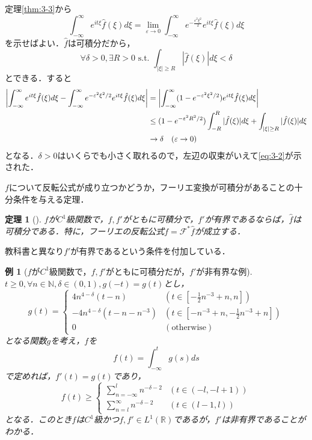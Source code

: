 \documentclass[dvipdfmx,a4j,10pt]{jsarticle}
\makeatletter
\theoremstyle{mystyle1}
\newtheorem{theorem}{定理}[section]
\theoremstyle{mystyle3}
\theoremstyle{mystyle4}
\theoremstyle{mystyle6}
\theoremstyle{mystyle2}
\newtheorem{ex*}{例}
\theoremstyle{mystyle5}
\renewenvironment{proof}[1][\proofname]{\par
  \pushQED{\qed}%
  \normalfont
  \topsep6\p@\@plus6\p@ \trivlist
  \item[\hskip\labelsep{\bfseries\sffamily #1}]\ignorespaces
}{%
  \popQED\endtrivlist\@endpefalse
}
\renewcommand\proofname{証明}
\newenvironment{thm}[1][]
{\begin{tcolorbox}[
    enhanced,
    boxrule=0pt,
    arc=0mm,
    frame hidden,
    borderline west={2pt}{-4pt}{red},
    breakable = true
    ]
    \begin{theorem}[#1]
}
{\end{theorem}\end{tcolorbox}}
\makeatother
\begin{document}
\begin{proof}
	定理\ref{thm:3-3}から
	\begin{equation}\label{eq:3-2}
		\int_{-\infty}^\infty e^{it\xi}\hat f(\xi)d\xi=\lim_{\varepsilon\to 0}\int_{-\infty}^\infty e^{-\frac{\varepsilon^2\xi^2}{2}}e^{it\xi}\hat{f}(\xi)d\xi
	\end{equation}
	を示せばよい．$\hat f$は可積分だから，
	\[
		\forall\delta>0,\exists R>0\,\,\textrm{s.t.}\,\,\int_{|\xi|\geq R}|\hat f(\xi)|	d\xi<\delta
	\]
	とできる．すると
	\[
		\begin{split}
			\mleft|\int_{-\infty}^\infty e^{it\xi}\hat f(\xi)d\xi-\int_{-\infty}^\infty e^{-\varepsilon^2\xi^2/2}e^{it\xi}\hat f(\xi)d\xi\mright|
			&=\mleft|\int_{-\infty}^\infty (1-e^{-\varepsilon^2\xi^2/2})e^{it\xi}\hat f(\xi)d\xi\mright| \\
			&\leq (1-e^{-\varepsilon^2R^2/2})\int_{-R}^R|\hat f(\xi)|d\xi+\int_{|\xi|\geq R}|\hat f(\xi)|d\xi \\
			&\to \delta \quad (\varepsilon\to 0)
		\end{split}
	\]
	となる．$\delta>0$はいくらでも小さく取れるので，左辺の収束がいえて\eqref{eq:3-2}が示された．
\end{proof}

$f$について反転公式が成り立つかどうか，フーリエ変換が可積分があることの十分条件を与える定理．

\begin{thm}\label{thm:3-6}
	$f$が$C^1$級関数で，$f,f'$がともに可積分で，$f'$が有界であるならば，$\hat f$は可積分である．特に，フーリエの反転公式$f=\mathcal{F}^*\hat f$が成立する．
\end{thm}

教科書と異なり$f'$が有界であるという条件を付加している．

\begin{ex*}[$f$が$C^1$級関数で，$f,f'$がともに可積分だが，$f'$が非有界な例]
	$t\geq 0,\forall n\in\mathbb{N},\delta\in (0,1),g(-t)=g(t)$とし，
	\[
		g(t)=\begin{cases}
			4n^{4-\delta}(t-n)         & (t\in [-\frac{1}{2}n^{-3}+n,n])         \\
			-4n^{4-\delta}(t-n-n^{-3}) & (t\in [-n^{-3}+n,-\frac{1}{2}n^{-3}+n]) \\
			0                          & (\textrm{otherwise})
		\end{cases}
	\]
	となる関数$g$を考え，$f$を
	\[
		f(t)=\int_{-\infty}^t g(s)ds
	\]
	で定めれば，$f'(t)=g(t)$であり，
	\[
		f(t)\geq\begin{cases}
			\sum_{n=-\infty}^l n^{-\delta-2} & (t\in (-l,-l+1)) \\
			\sum_{n=l}^\infty n^{-\delta-2}  & (t\in (l-1,l))
		\end{cases}
	\]
	となる．このとき$f$は$C^1$級かつ$f,f'\in L^1(\mathbb{R})$であるが，$f'$は非有界であることがわかる．
\end{ex*}
\end{document}
